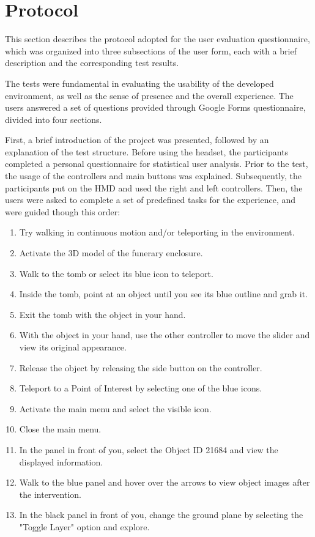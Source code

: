\section{Protocol}
\label{sec:protocol}

This section describes the protocol adopted for the user evaluation questionnaire, which was organized into three subsections of the user form, each with a brief description and the corresponding test results.

The tests were fundamental in evaluating the usability 
of the developed environment, as well as the sense of presence 
and the overall experience. 
The users answered a set of questions provided through Google Forms questionnaire, divided into four sections. 

First, a brief introduction of the project was presented, followed by an explanation of the test structure.
Before using the headset, the participants completed a personal questionnaire for statistical user analysis. 
Prior to the test, the usage of the controllers and main buttons was explained. 
Subsequently, the participants put on the \gls{HMD} and used the right and left controllers. 
Then, the users were asked to complete a set of predefined tasks for the experience, and were guided though this order:

\begin{enumerate}
\item{Try walking in continuous motion and/or teleporting in the environment.}
\item{Activate the 3D model of the funerary enclosure.}
\item{Walk to the tomb or select its blue icon to teleport.}
\item{Inside the tomb, point at an object until you see its blue outline and grab it.}
\item{Exit the tomb with the object in your hand.}
\item{With the object in your hand, use the other controller to move the slider and view its original appearance.}
\item{Release the object by releasing the side button on the controller.}
\item{Teleport to a Point of Interest by selecting one of the blue icons.}
\item{Activate the main menu and select the visible icon.}
\item{Close the main menu.}
\item{In the panel in front of you, select the Object ID 21684 and view the displayed information.}
\item{Walk to the blue panel and hover over the arrows to view object images after the intervention.}
\item{In the black panel in front of you, change the ground plane by selecting the "Toggle Layer" option and explore.}
\end{enumerate}

